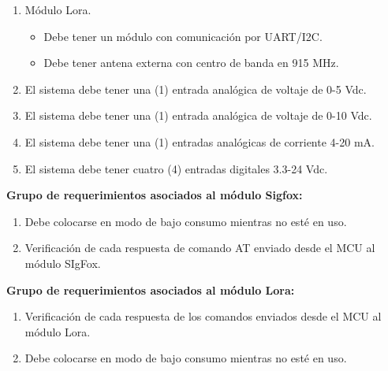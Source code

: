 \begin{enumerate}
\begin{itemize}
		\end{itemize}

	\item Módulo Lora.

		\begin{itemize}

			\item Debe tener un módulo con comunicación por UART/I2C.

			\item Debe tener antena externa con centro de banda en 915 MHz.

		\end{itemize}

		\item El sistema debe tener una (1) entrada analógica de voltaje de 0-5 Vdc.
		
		\item El sistema debe tener una (1) entrada analógica de voltaje de 0-10 Vdc.

		\item El sistema debe tener una (1) entradas analógicas de corriente 4-20 mA.

		\item El sistema debe tener cuatro (4) entradas digitales 3.3-24 Vdc.

\end{enumerate}



\textbf{Grupo de requerimientos asociados al módulo Sigfox:}

	\begin{enumerate}

		\item Debe colocarse en modo de bajo consumo mientras no esté en uso.

		\item Verificación de cada respuesta de comando AT enviado desde el MCU al módulo SIgFox.

	\end{enumerate}





\textbf{Grupo de requerimientos asociados al módulo Lora:}

	\begin{enumerate}

		\item Verificación de cada respuesta de los comandos enviados desde el MCU al módulo Lora.

		\item Debe colocarse en modo de bajo consumo mientras no esté en uso.

	\end{enumerate}




